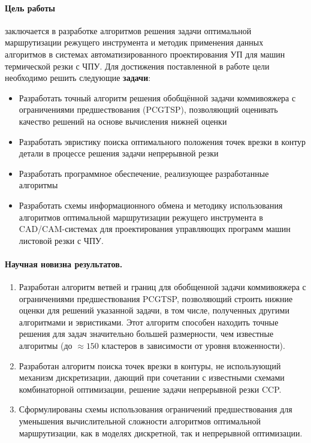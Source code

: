 \paragraph*{Цель работы}
заключается в разработке алгоритмов решения задачи оптимальной
маршрутизации режущего инструмента
и методик применения данных алгоритмов
в системах автоматизированного проектирования УП для машин термической резки с ЧПУ.
Для достижения поставленной в работе цели необходимо решить следующие
\textbf{задачи}:

\begin{itemize}
  \item
    Разработать точный алгоритм решения
    обобщённой задачи коммивояжера
    с ограничениями предшествования (PCGTSP),
    позволяющий оценивать качество решений
    на основе вычисления нижней оценки
  \item
    Разработать эвристику поиска оптимального положения
    точек врезки в контур детали в процессе решения задачи
    непрерывной резки
  \item
    Разработать программное обеспечение,
    реализующее разработанные алгоритмы
  \item
    Разработать схемы информационного обмена
    и методику использования алгоритмов
    оптимальной маршрутизации режущего инструмента
    в CAD/CAM-системах
    для проектирования управляющих программ
    машин листовой резки с ЧПУ.
\end{itemize}

\paragraph*{Научная новизна результатов.}

\begin{enumerate}
    \item
    Разработан алгоритм ветвей и границ для обобщенной задачи коммивояжера с ограничениями предшествования PCGTSP,
    позволяющий строить нижние оценки для решений указанной задачи,
    в том числе, полученных другими алгоритмами и эвристиками.
    Этот алгоритм способен находить точные решения
    для задач значительно большей размерности,
    чем известные алгоритмы
    (до $\approx 150$ кластеров в зависимости от уровня вложенности).
    \item
    Разработан алгоритм поиска точек врезки в контуры,
    не использующий механизм дискретизации,
    дающий при сочетании с известными схемами комбинаторной оптимизации,
    решение задачи непрерывной резки CCP.
    \item
    Сформулированы схемы использования ограничений предшествования
    для уменьшения вычислительной сложности алгоритмов оптимальной маршрутизации,
    как в моделях дискретной,
    так и непрерывной оптимизации.
\end{enumerate}

